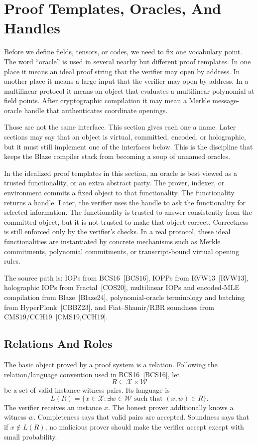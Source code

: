 \section{Proof Templates, Oracles, And Handles}

Before we define fields, tensors, or codes, we need to fix one vocabulary point.
The word ``oracle'' is used in several nearby but different proof templates.  In
one place it means an ideal proof string that the verifier may open by address.
In another place it means a large input that the verifier may open by address.
In a multilinear protocol it means an object that evaluates a multilinear
polynomial at field points.  After cryptographic compilation it may mean a
Merkle message-oracle handle that authenticates coordinate openings.

Those are not the same interface.  This section gives each one a name.  Later
sections may say that an object is virtual, committed, encoded, or holographic,
but it must still implement one of the interfaces below.  This is the discipline
that keeps the Blaze compiler stack from becoming a soup of unnamed oracles.

In the idealized proof templates in this section, an oracle is best viewed as a
trusted functionality, or an extra abstract party.  The prover, indexer, or
environment commits a fixed object to that functionality.  The functionality
returns a handle.  Later, the verifier uses the handle to ask the functionality
for selected information.  The functionality is trusted to answer consistently
from the committed object, but it is not trusted to make that object correct.
Correctness is still enforced only by the verifier's checks.  In a real
protocol, these ideal functionalities are instantiated by concrete mechanisms
such as Merkle commitments, polynomial commitments, or transcript-bound virtual
opening rules.

The source path is: IOPs from BCS16~[BCS16], IOPPs from RVW13~[RVW13],
holographic IOPs from Fractal~[COS20], multilinear IOPs and encoded-MLE
compilation from Blaze~[Blaze24], polynomial-oracle terminology and batching from
HyperPlonk~[CBBZ23], and Fiat--Shamir/RBR soundness from
CMS19/CCH19~[CMS19,CCH19].

\subsection{Relations And Roles}

The basic object proved by a proof system is a relation.  Following the
relation/language convention used in BCS16~[BCS16], let
\[
  R\subseteq \mathcal X\times\mathcal W
\]
be a set of valid instance-witness pairs.  Its language is
\[
  L(R)
  =
  \{x\in\mathcal X:\exists w\in\mathcal W\text{ such that }(x,w)\in R\}.
\]
The verifier receives an instance \(x\).  The honest prover additionally knows
a witness \(w\).  Completeness says that valid pairs are accepted.  Soundness
says that if \(x\notin L(R)\), no malicious prover should make the verifier
accept except with small probability.

